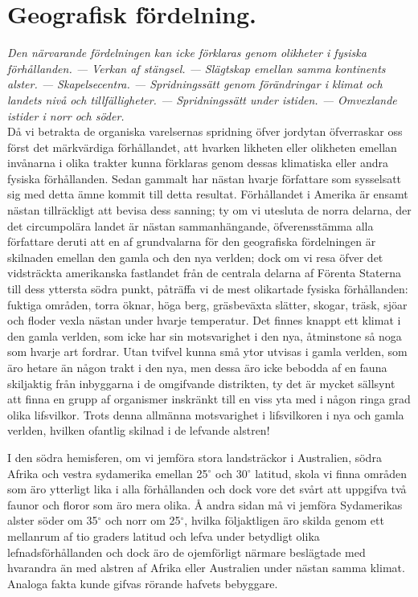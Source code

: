 


\chapter{Geografisk fördelning.}

{\it
Den närvarande fördelningen kan icke förklaras genom olikheter i fysiska förhållanden. — Verkan af stängsel. — Slägtskap emellan samma kontinents alster. — Skapelsecentra. — Spridningssätt genom förändringar i klimat och landets nivå och tillfälligheter. — Spridningssätt under istiden. — Omvexlande istider i norr och söder.
}\\[0.5cm]

Då vi betrakta de organiska varelsernas spridning öfver jordytan öfverraskar oss först det märkvärdiga förhållandet, att hvarken likheten eller olikheten emellan invånarna i olika trakter kunna förklaras genom dessas klimatiska eller andra fysiska förhållanden. Sedan gammalt har nästan hvarje författare som sysselsatt sig med detta ämne kommit till detta resultat. Förhållandet i Amerika är ensamt nästan tillräckligt att bevisa dess sanning; ty om vi utesluta de norra delarna, der det circumpolära landet är nästan sammanhängande, öfverensstämma alla författare deruti att en af grundvalarna för den geografiska fördelningen är skilnaden emellan den gamla och den nya verlden; dock om vi resa öfver det vidsträckta amerikanska fastlandet från de centrala delarna af Förenta Staterna till dess yttersta södra punkt, påträffa vi de mest olikartade fysiska förhållanden: fuktiga områden, torra öknar, höga berg, gräsbeväxta slätter, skogar, träsk, sjöar och floder vexla nästan under hvarje temperatur. Det finnes knappt ett klimat i den gamla verlden, som icke har sin motsvarighet i den nya, åtminstone så noga som hvarje art fordrar. Utan tvifvel kunna små ytor utvisas i gamla verlden, som äro hetare än någon trakt i den nya, men dessa äro icke bebodda af en fauna skiljaktig från inbyggarna i de omgifvande distrikten, ty det är mycket sällsynt att finna en grupp af organismer inskränkt till en viss yta med i någon ringa grad olika lifsvilkor. Trots denna allmänna motsvarighet i lifsvilkoren i nya och gamla verlden, hvilken ofantlig skilnad i de lefvande alstren!

I den södra hemisferen, om vi jemföra stora landsträckor i Australien, södra Afrika och vestra sydamerika emellan 25${}^\circ$ och 30${}^\circ$ latitud, skola vi finna områden som äro ytterligt lika i alla förhållanden och dock vore det svårt att uppgifva två faunor och floror som äro mera olika. Å andra sidan må vi jemföra Sydamerikas alster söder om 35${}^\circ$ och norr om 25${}^\circ$, hvilka följaktligen äro skilda genom ett mellanrum af tio graders latitud och lefva under betydligt olika lefnadsförhållanden och dock äro de ojemförligt närmare beslägtade med hvarandra än med alstren af Afrika eller Australien under nästan samma klimat. Analoga fakta kunde gifvas rörande hafvets bebyggare.

